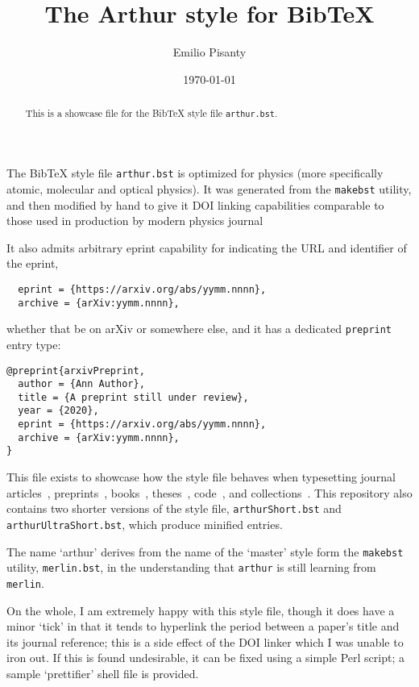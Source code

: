 \documentclass[%
  reprint,
  aps,
  pra,
  superscriptaddress,
  a4paper
]{revtex4-2}
\begin{document}
\title{The Arthur style for BibTeX}

\author{Emilio Pisanty}

\date{\today}

\begin{abstract}
This is a showcase file for the BibTeX style file \texttt{arthur.bst}.
\end{abstract}

\maketitle

The BibTeX style file \texttt{arthur.bst} is optimized for physics (more specifically atomic, molecular and optical physics). It was generated from the \texttt{makebst} utility, and then modified by hand to give it DOI linking capabilities comparable to those used in production by modern physics journal

It also admits arbitrary eprint capability for indicating the URL and identifier of the eprint,
\begin{verbatim}
  eprint = {https://arxiv.org/abs/yymm.nnnn},
  archive = {arXiv:yymm.nnnn},
\end{verbatim}
whether that be on arXiv or somewhere else, and it has a dedicated \texttt{preprint} entry type:
\begin{verbatim}
@preprint{arxivPreprint,
  author = {Ann Author},
  title = {A preprint still under review},
  year = {2020},
  eprint = {https://arxiv.org/abs/yymm.nnnn},
  archive = {arXiv:yymm.nnnn},
}  
\end{verbatim}

This file exists to showcase how the style file behaves when typesetting 
journal articles~\cite{journalArticle},
preprints~\cite{arxivPreprint}, 
books~\cite{bookExample}, 
theses~\cite{thesisExample}, 
code~\cite{codeExample}, and
collections~\cite{collectionExample}.
This repository also contains two shorter versions of the style file, \texttt{arthurShort.bst} and \texttt{arthurUltraShort.bst}, which produce minified entries.


The name `arthur' derives from the name of the `master' style form the \texttt{makebst} utility, \texttt{merlin.bst}, in the understanding that \texttt{arthur} is still learning from \texttt{merlin}.

On the whole, I am extremely happy with this style file, though it does have a minor `tick' in that it tends to hyperlink the period between a paper's title and its journal reference; this is a side effect of the DOI linker which I was unable to iron out. 
If this is found undesirable, it can be fixed using a simple Perl script; a sample `prettifier' shell file is provided.
\end{document}
